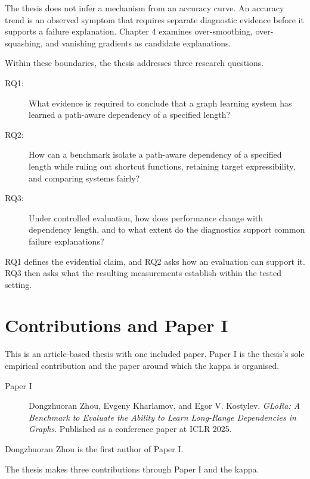 The thesis does not infer a mechanism from an accuracy curve.
An accuracy trend is an observed symptom that requires separate diagnostic evidence before it supports a failure explanation.
Chapter 4 examines over-smoothing, over-squashing, and vanishing gradients as candidate explanations.

Within these boundaries, the thesis addresses three research questions.

\begin{description}
\item[RQ1:]
What evidence is required to conclude that a graph learning system has learned a path-aware dependency of a specified length?

\item[RQ2:]
How can a benchmark isolate a path-aware dependency of a specified length while ruling out shortcut functions, retaining target expressibility, and comparing systems fairly?

\item[RQ3:]
Under controlled evaluation, how does performance change with dependency length, and to what extent do the diagnostics support common failure explanations?
\end{description}

RQ1 defines the evidential claim, and RQ2 asks how an evaluation can support it.
RQ3 then asks what the resulting measurements establish within the tested setting.

\section{Contributions and Paper I}

This is an article-based thesis with one included paper.
Paper I is the thesis's sole empirical contribution and the paper around which the kappa is organised.

\begin{description}
\item[Paper I]
Dongzhuoran Zhou, Evgeny Kharlamov, and Egor V. Kostylev.
\emph{GLoRa: A Benchmark to Evaluate the Ability to Learn Long-Range Dependencies in Graphs}.
Published as a conference paper at ICLR 2025.
\end{description}

Dongzhuoran Zhou is the first author of Paper I.

The thesis makes three contributions through Paper I and the kappa.

